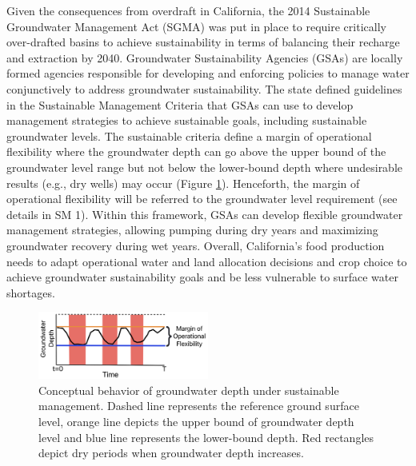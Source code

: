 \documentclass[a4paper,fleqn]{cas-sc}
\begin{document}
Given the consequences from overdraft in California, the 2014 Sustainable Groundwater Management Act (SGMA) \citep{dwr_sustainable_2021} was put in place to require critically over-drafted basins to achieve sustainability in terms of balancing their recharge and extraction by 2040. Groundwater Sustainability Agencies (GSAs) are locally formed agencies responsible for developing and enforcing policies to manage water conjunctively to address groundwater sustainability. The state defined guidelines in the Sustainable Management Criteria \citep{dwr_sustainable_2017} that GSAs can use to develop management strategies to achieve sustainable goals, including sustainable groundwater levels. The sustainable criteria define a margin of operational flexibility where the groundwater depth can go above the upper bound of the groundwater level range but not below the lower-bound depth where undesirable results (e.g., dry wells) may occur (Figure \ref{fig:1}). Henceforth, the margin of operational flexibility will be referred to the groundwater level requirement (see details in SM 1). Within this framework, GSAs can develop flexible groundwater management strategies, allowing pumping during dry years and maximizing groundwater recovery during wet years. Overall, California's food production needs to adapt operational water and land allocation decisions and crop choice to achieve groundwater sustainability goals and be less vulnerable to surface water shortages. 


 \begin{figure}[ht]
    \includegraphics[width=0.5\textwidth,center]{./figs/conceptual_sgma_policy.jpg}
    \caption{Conceptual behavior of groundwater depth under sustainable management. Dashed line represents the reference ground surface level, orange line depicts the upper bound of groundwater depth level and blue line represents the lower-bound depth. Red rectangles depict dry periods when groundwater depth increases.}
    \label{fig:1}
\end{figure}
\end{document}
